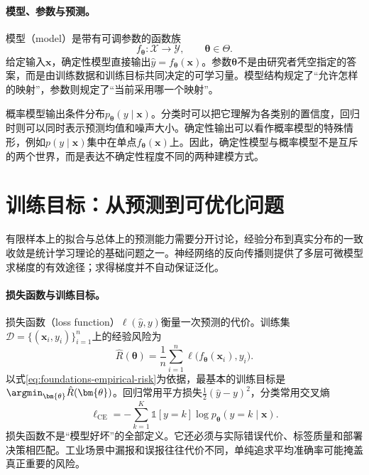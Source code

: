 \paragraph{模型、参数与预测。}
模型（model）是带有可调参数的函数族
\begin{equation}
 f_{\bm{\theta}}:\mathcal{X}\rightarrow\mathcal{Y},
 \qquad \bm{\theta}\in\Theta.
\end{equation}
给定输入$\bm{x}$，确定性模型直接输出$\hat{y}=f_{\bm{\theta}}(\bm{x})$。参数$\bm{\theta}$不是由研究者凭空指定的答案，而是由训练数据和训练目标共同决定的可学习量。模型结构规定了“允许怎样的映射”，参数则规定了“当前采用哪一个映射”。

概率模型输出条件分布$p_{\bm{\theta}}(y\mid\bm{x})$。分类时可以把它理解为各类别的置信度，回归时则可以同时表示预测均值和噪声大小。确定性输出可以看作概率模型的特殊情形，例如$p(y\mid\bm{x})$集中在单点$f_{\bm{\theta}}(\bm{x})$上。因此，确定性模型与概率模型不是互斥的两个世界，而是表达不确定性程度不同的两种建模方式。

\section{训练目标：从预测到可优化问题}
有限样本上的拟合与总体上的预测能力需要分开讨论，经验分布到真实分布的一致收敛是统计学习理论的基础问题之一\cite{vapnik1971uniform}。神经网络的反向传播则提供了多层可微模型求梯度的有效途径\cite{rumelhart1986backprop}；求得梯度并不自动保证泛化。
\paragraph{损失函数与训练目标。}
损失函数（loss function）$\ell(\hat{y},y)$衡量一次预测的代价。训练集$\mathcal{D}=\{(\bm{x}_i,y_i)\}_{i=1}^n$上的经验风险为
\begin{equation}
 \hat{R}(\bm{\theta})=\frac{1}{n}\sum_{i=1}^{n}\ell\bigl(f_{\bm{\theta}}(\bm{x}_i),y_i\bigr).\label{eq:foundations-empirical-risk}
\end{equation}
以式\eqref{eq:foundations-empirical-risk}为依据，最基本的训练目标是$\argmin_{\bm{\theta}}\hat{R}(\bm{\theta})$。回归常用平方损失$\frac12(\hat{y}-y)^2$，分类常用交叉熵
\begin{equation}
 \ell_{\mathrm{CE}}=-\sum_{k=1}^{K}\mathbb{1}[y=k]\log p_{\bm{\theta}}(y=k\mid\bm{x}).
\end{equation}
损失函数不是“模型好坏”的全部定义。它还必须与实际错误代价、标签质量和部署决策相匹配。工业场景中漏报和误报往往代价不同，单纯追求平均准确率可能掩盖真正重要的风险。

